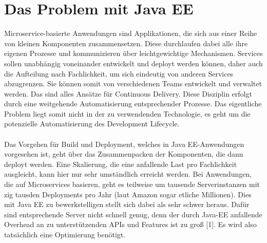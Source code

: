 \section{Das Problem mit Java EE}
Microservice-basierte Anwendungen sind Applikationen, die sich aus einer Reihe von kleinen Komponenten zusammensetzen. Diese durchlaufen dabei alle ihre eigenen Prozesse und kommunizieren über leichtgewichtige Mechanismen. Services sollen unabhängig voneinander entwickelt und deployt werden können, daher auch die Aufteilung nach Fachlichkeit, um sich eindeutig von anderen Services abzugrenzen. Sie können somit von verschiedenen Teams entwickelt und verwaltet werden. Das sind alles Ansätze für Continuous Delivery. Diese Disziplin erfolgt durch eine weitgehende Automatisierung entsprechender Prozesse. Das eigentliche Problem liegt somit nicht in der zu verwendenden Technologie, es geht um die potenzielle Automatisierung des Development Lifecycle.\\ \\ 
Das Vorgehen für Build und Deployment, welches in Java EE-Anwendungen vorgesehen ist, geht über das Zusammenpacken der Komponenten, die dann deployt werden. Eine Skalierung, die eine anfallende Last pro Fachlichkeit ausgleicht, kann hier nur sehr umständlich erreicht werden. Bei Anwendungen, die auf Microservices basieren, geht es teilweise um tausende Serverinstanzen mit zig tausden Deployments pro Jahr (laut Amazon sogar etliche Millionen). Dies mit Java EE zu bewerkstelligen stellt sich dabei als sehr schwer heraus. Dafür sind entsprechende Server nicht schnell genug, denn der durch Java-EE anfallende Overhead an zu unterstützenden APIs und Features ist zu groß [1]. Es wird also tatsächlich eine Optimierung benötigt. \\ \\
